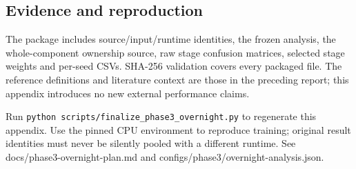 \documentclass[
  10pt,
  a4paper,
]{article}
\begin{document}
\hypertarget{evidence-and-reproduction}{%
\subsection{Evidence and reproduction}\label{evidence-and-reproduction}}

The package includes source/input/runtime identities, the frozen
analysis, the whole-component ownership source, raw stage confusion
matrices, selected stage weights and per-seed CSVs. SHA-256 validation
covers every packaged file. The reference definitions and literature
context are those in the preceding report; this appendix introduces no
new external performance claims.

Run \texttt{python\ scripts/finalize\_phase3\_overnight.py} to
regenerate this appendix. Use the pinned CPU environment to reproduce
training; original result identities must never be silently pooled with
a different runtime. See docs/phase3-overnight-plan.md and
configs/phase3/overnight-analysis.json.
\end{document}
